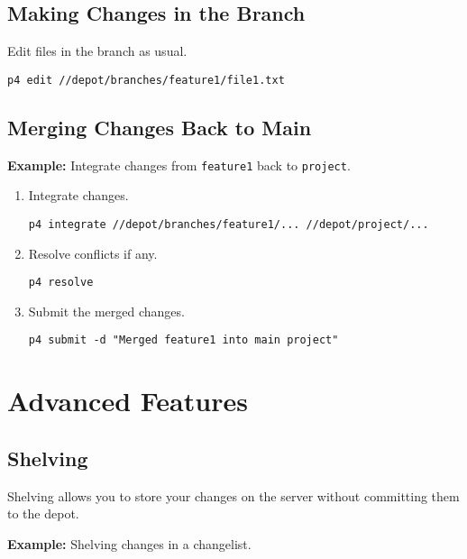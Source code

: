\documentclass{article}
\begin{document}
\subsection{Making Changes in the Branch}

Edit files in the branch as usual.

\begin{lstlisting}[style=bash]
p4 edit //depot/branches/feature1/file1.txt
\end{lstlisting}

\subsection{Merging Changes Back to Main}

\textbf{Example:} Integrate changes from \texttt{feature1} back to \texttt{project}.

\begin{enumerate}
    \item Integrate changes.

\begin{lstlisting}[style=bash]
p4 integrate //depot/branches/feature1/... //depot/project/...
\end{lstlisting}

    \item Resolve conflicts if any.

\begin{lstlisting}[style=bash]
p4 resolve
\end{lstlisting}

    \item Submit the merged changes.

\begin{lstlisting}[style=bash]
p4 submit -d "Merged feature1 into main project"
\end{lstlisting}
\end{enumerate}

\section{Advanced Features}

\subsection{Shelving}

Shelving allows you to store your changes on the server without committing them to the depot.

\textbf{Example:} Shelving changes in a changelist.
\end{document}
